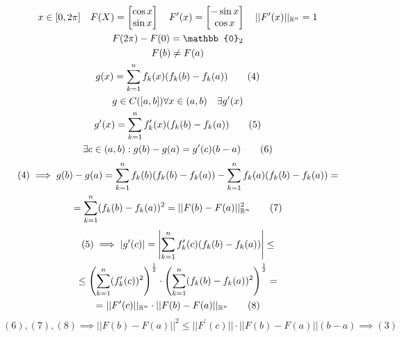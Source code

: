 \documentclass[main]{subfiles}
\begin{document}
\begin{example}[Важный!]
    \begin{gather*}
        x \in [0, 2\pi] \quad
        F(X) = \begin{bmatrix}
            \cos x \\
            \sin x
        \end{bmatrix} \quad F^\prime(x) = \begin{bmatrix}
            -\sin x \\
            \cos x
        \end{bmatrix} \quad ||F^\prime(x)||_{\vR^n} = 1 \\
        F(2\pi) - F(0) = \mathbb{0}_2 \\
        F(b) \ne F(a) \\
        g(x) = \sum^n_{k=1} f_k(x)(f_k(b)-f_k(a)) \tag{4}\\
        g \in C([a,b]) \forall x \in (a,b) \quad \exists g^\prime(x) \\
        g^\prime(x) = \sum^n_{k=1} f^\prime_k(x)(f_k(b) - f_k(a)) \tag{5} \\
        \exists c \in (a,b) : g(b) - g(a) = g^\prime(c)(b-a) \tag{6} 
    \end{gather*}
    \begin{multline*}
        (4) \implies g(b) - g(a) = \sum^n_{k=1} f_k(b)(f_k(b)-f_k(a)) - \sum^n_{k=1}f_k(a)(f_k(b)-f_k(a)) = \\
        = \sum^n_{k=1} (f_k(b) - f_k(a))^2 = ||F(b)-F(a)||^2_{\mathbb{R}^n} \tag{7}
    \end{multline*}
    \begin{multline*}
        (5) \implies |g^\prime(c)| = \left| \sum^n_{k=1}f^\prime_k(c)(f_k(b)-f_k(a))\right| \leq \\
        \leq \left( \sum^n_{k=1} (f^\prime_k(c))^2 \right)^{\frac{1}{2}} \cdot \left( \sum^n_{k=1}(f_k(b)-f_k(a))^2\right)^{\frac{1}{2}} = \\
        = ||F^\prime(c)||_{\mathbb{R}^n} \cdot ||F(b) -F(a)||_{\mathbb{R}^n} \tag{8}
    \end{multline*}
    \[ (6),(7),(8) \implies ||F(b) - F(a)||^2 \leq ||F^\prime(c)|| \cdot ||F(b) - F(a)||(b-a) \implies (3) \] 
\end{example}
\end{document}
